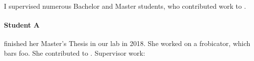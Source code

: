 I supervised numerous Bachelor and Master students, who contributed work to .

\paragraph{Student A} finished her Master's Thesis in our lab in 2018.
She worked on a frobicator, which bars foo.
She contributed to \cite{paper1,paper2}.
Supervisor work:
